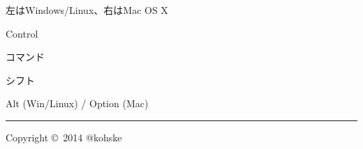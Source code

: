 \documentclass[10pt,landscape]{ltjarticle}
\begin{document}
\begin{multicols}{3}
\begin{framed}
左はWindows/Linux、右はMac OS X

\begin{description}
\setlength{\parskip}{0cm} 
\setlength{\itemsep}{1pt}
\item[\ctlkey] Control
\item[\cmdkey] コマンド
\item[\shiftkey] シフト
\item[\optkey] Alt (Win/Linux) / Option (Mac)
\end{description}
\end{framed}

\rule{0.3\linewidth}{0.25pt}

\scriptsize
Copyright \copyright\ 2014 @kohske

\end{multicols}
\end{document}
